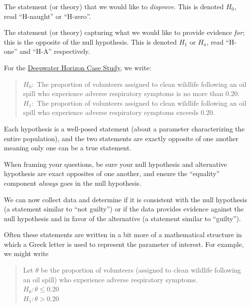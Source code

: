 \documentclass[]{book}
\theoremstyle{plain}
\theoremstyle{mydefn}
\theoremstyle{myexmpl}
\theoremstyle{remark}
\let\BeginKnitrBlock\begin \let\EndKnitrBlock\end
\let\BeginKnitrBlock\begin \let\EndKnitrBlock\end
\begin{document}
\BeginKnitrBlock{definition}[Null Hypothesis]
\protect\hypertarget{def:defn-null-hypothesis}{}{\label{def:defn-null-hypothesis}
{} }The statement (or theory) that we
would like to \emph{disprove}. This is denoted \(H_0\), read
``H-naught'' or ``H-zero''.
\EndKnitrBlock{definition}

\BeginKnitrBlock{definition}[Alternative Hypothesis]
\protect\hypertarget{def:defn-alternative-hypothesis}{}{\label{def:defn-alternative-hypothesis}
{} }The statement (or theory)
capturing what we would like to provide evidence \emph{for}; this is the
opposite of the null hypothesis. This is denoted \(H_1\) or \(H_a\),
read ``H-one'' and ``H-A'' respectively.
\EndKnitrBlock{definition}

For the \protect\hyperlink{CaseDeepwater}{Deepwater Horizon Case Study},
we write:

\begin{quote}
\(H_0:\) The proportion of volunteers assigned to clean wildlife
following an oil spill who experience adverse respiratory symptoms is no
more than 0.20.\\
\(H_1:\) The proportion of volunteers assigned to clean wildlife
following an oil spill who experience adverse respiratory symptoms
exceeds 0.20.
\end{quote}

Each hypothesis is a well-posed statement (about a parameter
characterizing the entire population), and the two statements are
exactly opposite of one another meaning only one can be a true
statement.

\BeginKnitrBlock{rmdtip}
When framing your questions, be sure your null hypothesis and
alternative hypothesis are exact opposites of one another, and ensure
the ``equality'' component \emph{always} goes in the null hypothesis.
\EndKnitrBlock{rmdtip}

We can now collect data and determine if it is consistent with the null
hypothesis (a statement similar to ``not guilty'') or if the data
provides evidence against the null hypothesis and in favor of the
alternative (a statement similar to ``guilty'').

Often these statements are written in a bit more of a mathematical
structure in which a Greek letter is used to represent the parameter of
interest. For example, we might write

\begin{quote}
Let \(\theta\) be the proportion of volunteers (assigned to clean
wildlife following an oil spill) who experience adverse respiratory
symptoms.\\
\(H_0: \theta \leq 0.20\)\\
\(H_1: \theta > 0.20\)
\end{quote}
\end{document}

